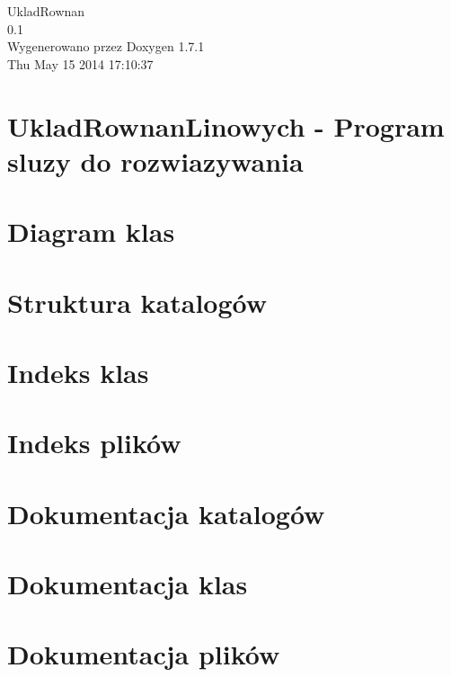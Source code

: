 \documentclass[a4paper]{book}
\begin{document}
\hypersetup{pageanchor=false}
\begin{titlepage}
\vspace*{7cm}
\begin{center}
{\Large UkladRownan \\[1ex]\large 0.1 }\\
\vspace*{1cm}
{\large Wygenerowano przez Doxygen 1.7.1}\\
\vspace*{0.5cm}
{\small Thu May 15 2014 17:10:37}\\
\end{center}
\end{titlepage}
\clearemptydoublepage
{}
\tableofcontents
\clearemptydoublepage
{}
\hypersetup{pageanchor=true}
\chapter{UkladRownanLinowych -\/ Program sluzy do rozwiazywania}
\label{index}\hypertarget{index}{}
\chapter{Diagram klas}
\label{strona-diagramu-klas}
\hypertarget{strona-diagramu-klas}{}

\chapter{Struktura katalogów}

\chapter{Indeks klas}

\chapter{Indeks plików}

\chapter{Dokumentacja katalogów}



\chapter{Dokumentacja klas}





\chapter{Dokumentacja plików}










\printindex
\end{document}
